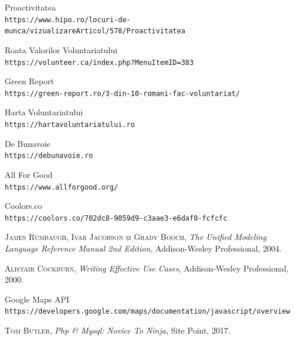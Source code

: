 \documentclass[12pt,a4paper]{report}
\begin{document}
\begin{thebibliography}{1}
Proactivitatea
\\\texttt{https://www.hipo.ro/locuri-de-munca/vizualizareArticol/578/Proactivitatea}

Roata Valorilor Voluntariatului
\\\texttt{https://volunteer.ca/index.php?MenuItemID=383}

Green Report
\\\texttt{https://green-report.ro/3-din-10-romani-fac-voluntariat/}

Harta Voluntariatului
\\\texttt{https://hartavoluntariatului.ro}

De Bunavoie
\\\texttt{https://debunavoie.ro}

All For Good
\\\texttt{https://www.allforgood.org/}

Coolors.co
\\\texttt{https://coolors.co/702dc8-9059d9-c3aae3-e6daf0-fcfcfc}

\textsc{James Rumbaugh, Ivar Jacobson și Grady Booch}, \emph{The Unified Modeling Language Reference Manual 2nd Edition}, Addison-Wesley Professional, 2004.

\textsc{Alistair Cockburn}, \emph{Writing Effective Use Cases}, Addison-Wesley Professional, 2000.

Google Maps API
\\\texttt{https://developers.google.com/maps/documentation/javascript/overview}

\textsc{Tom Butler}, \emph{Php \& Mysql: Novice To Ninja}, Site Point, 2017.

\end{thebibliography}
\end{document}
